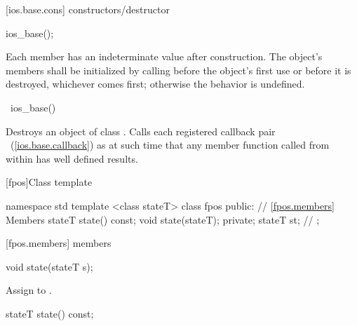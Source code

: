 [ios.base.cons]{ constructors/destructor}

%
\begin{itemdecl}
ios_base();
\end{itemdecl}

\begin{itemdescr}
\pnum
\effects
Each
member has an indeterminate value after construction.
The object's members shall be initialized by calling
before the object's first use or before it is destroyed, whichever comes first; otherwise
the behavior is undefined.
\end{itemdescr}

%
\begin{itemdecl}
~ios_base()
\end{itemdecl}

\begin{itemdescr}
\pnum
\effects
Destroys an object of class
.
Calls each registered callback pair
~(\ref{ios.base.callback}) as
at such time that any
member function called from within
has well defined results.
\end{itemdescr}

[fpos]{Class template }

%
\begin{codeblock}
namespace std {
  template <class stateT> class fpos {
  public:
    // \ref{fpos.members} Members
    stateT state() const;
    void state(stateT);
  private;
    stateT st; // \exposr
  };
}
\end{codeblock}

[fpos.members]{ members}

%
\begin{itemdecl}
void state(stateT s);
\end{itemdecl}

\begin{itemdescr}
\pnum
\effects
Assign  to .
\end{itemdescr}

%
%
\begin{itemdecl}
stateT state() const;
\end{itemdecl}

